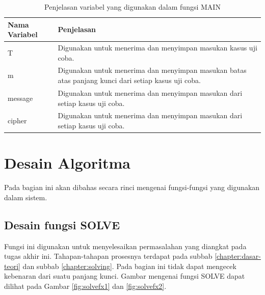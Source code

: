 \begin{table}[H]
	 	\caption{Penjelasan variabel yang digunakan dalam fungsi MAIN}
		\begin{tabular}   {|p{3cm}|p{6cm}|}\hline
		Nama Variabel&Penjelasan \\ \hline
		T&Digunakan untuk menerima dan menyimpan masukan kasus uji coba. \\ \hline
		m&Digunakan untuk menerima dan menyimpan masukan batas atas panjang kunci dari setiap kasus uji coba. \\ \hline
		message&Digunakan untuk menerima dan menyimpan masukan \plaintext dari setiap kasus uji coba.\\ \hline
		cipher&Digunakan untuk menerima dan menyimpan masukan \ciphertext dari setiap kasus uji coba. \\ \hline
		\end{tabular}%
		\label{tab:mainvar}
	\end{table}
	
\section{Desain Algoritma}
 Pada bagian ini akan dibahas secara rinci mengenai fungsi-fungsi yang digunakan dalam sistem.  
  \subsection{Desain fungsi SOLVE}
  \label{chapter:fxsolve}
  Fungsi ini digunakan untuk menyelesaikan permasalahan yang diangkat pada tugas akhir ini. Tahapan-tahapan prosesnya terdapat pada subbab \ref{chapter:dasar-teori} dan subbab \ref{chapter:solving}. Pada bagian ini tidak dapat mengecek kebenaran dari suatu panjang kunci. Gambar mengenai fungsi SOLVE dapat dilihat pada Gambar \ref{fig:solvefx1} dan \ref{fig:solvefx2}. %
  
